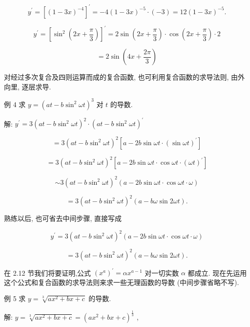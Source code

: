 \documentclass[lang=cn,newtx,10pt,scheme=chinese]{elegantbook}
\begin{document}
\[
{y}^{\prime } = {\left\lbrack {\left( 1 - 3x\right) }^{-4}\right\rbrack }^{\prime } = - 4{\left( 1 - 3x\right) }^{-5} \cdot \left( {-3}\right) = {12}{\left( 1 - 3x\right) }^{-5}.
\]

\[
{y}^{\prime } = {\left\lbrack {\sin }^{2}\left( 2x + \frac{\pi }{3}\right) \right\rbrack }^{\prime } = 2\sin \left( {{2x} + \frac{\pi }{3}}\right) \cdot \cos \left( {{2x} + \frac{\pi }{3}}\right) \cdot 2
\]

\[
= 2\sin \left( {{4x} + \frac{2\pi }{3}}\right)
\]

对经过多次复合及四则运算而成的复合函数, 也可利用复合函数的求导法则, 由外向里, 逐层求导.

例 4 求 \(y = {\left( at - b{\sin }^{2}\omega t\right) }^{3}\) 对 \(t\) 的导数.

解: \({y}^{\prime } = 3{\left( at - b{\sin }^{2}\omega t\right) }^{2} \cdot {\left( at - b{\sin }^{2}\omega t\right) }^{\prime }\)

\[
= 3{\left( at - b{\sin }^{2}\omega t\right) }^{2}\left\lbrack {a - {2b}\sin {\omega t} \cdot {\left( \sin \omega t\right) }^{\prime }}\right\rbrack
\]

\[
= 3{\left( at - b{\sin }^{2}\omega t\right) }^{2}\left\lbrack {a - {2b}\sin {\omega t} \cdot \cos {\omega t} \cdot {\left( \omega t\right) }^{\prime }}\right\rbrack
\]

\[
\sim 3{\left( at - b{\sin }^{2}\omega t\right) }^{2}\left( {a - {2b}\sin {\omega t} \cdot \cos {\omega t} \cdot \omega }\right)
\]

\[
= 3{\left( at - b{\sin }^{2}\omega t\right) }^{2}\left( {a - {b\omega }\sin {2\omega t}}\right) \text{.}
\]

熟练以后, 也可省去中间步骤, 直接写成

\[
{y}^{\prime } = 3{\left( at - b{\sin }^{2}\omega t\right) }^{2}\left( {a - {2b}\sin {\omega t} \cdot \cos {\omega t} \cdot \omega }\right)
\]

\[
= 3{\left( at - b{\sin }^{2}\omega t\right) }^{2}\left( {a - {b\omega }\sin {2\omega t}}\right) \text{.}
\]

在 2.12 节我们将要证明,公式 \({\left( {x}^{a}\right) }^{\prime } = \alpha {x}^{a - 1}\) 对一切实数 \(\alpha\) 都成立. 现在先运用这个公式和复合函数的求导法则来求一些无理函数的导数 (中间步骤省略不写).

例 5 求 \(y = \sqrt[3]{a{x}^{2} + {bx} + c}\) 的导数.

解: \(y = \sqrt[3]{a{x}^{2} + {bx} + c} = {\left( a{x}^{2} + bx + c\right) }^{\frac{1}{3}}\) ,
\end{document}
